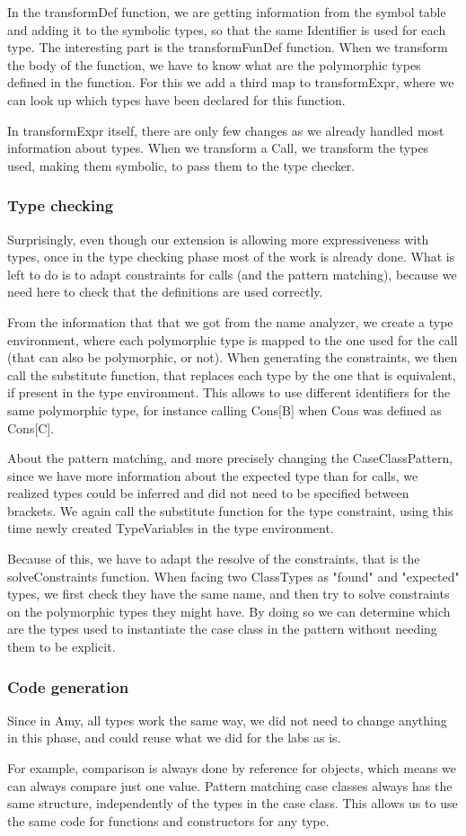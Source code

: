In the transformDef function, we are getting information from the symbol table and adding it to the symbolic types, so that the same Identifier is used for each type. The interesting part is the transformFunDef function. When we transform the body of the function, we have to know what are the polymorphic types defined in the function. For this we add a third map to transformExpr, where we can look up which types have been declared for this function.

In transformExpr itself, there are only few changes as we already handled most information about types. When we transform a Call, we transform the types used, making them symbolic, to pass them to the type checker.
\subsubsection{Type checking}
Surprisingly, even though our extension is allowing more expressiveness with types, once in the type checking phase most of the work is already done. What is left to do is to adapt constraints for calls (and the pattern matching), because we need here to check that the definitions are used correctly. 

From the information that that we got from the name analyzer, we create a type environment, where each polymorphic type is mapped to the one used for the call (that can also be polymorphic, or not). When generating the constraints, we then call the substitute function, that replaces each type by the one that is equivalent, if present in the type environment. This allows to use different identifiers for the same polymorphic type, for instance calling Cons[B] when Cons was defined as Cons[C].

About the pattern matching, and more precisely changing the CaseClassPattern, since we have more information about the expected type than for calls, we realized types could be inferred and did not need to be specified between brackets. We again call the substitute function for the type constraint, using this time newly created TypeVariables in the type environment. 

Because of this, we have to adapt the resolve of the constraints, that is the solveConstraints function. When facing two ClassTypes as "found" and "expected" types, we first check they have the same name, and then try to solve constraints on the polymorphic types they might have. By doing so we can determine which are the types used to instantiate the case class in the pattern without needing them to be explicit.
\subsubsection{Code generation}
Since in Amy, all types work the same way, we did not need to change anything in this phase, and could reuse what we did for the labs as is. 

For example, comparison is always done by reference for objects, which means we can always compare just one value. Pattern matching case classes always has the same structure, independently of the types in the case class. This allows us to use the same code for functions and constructors for any type.
